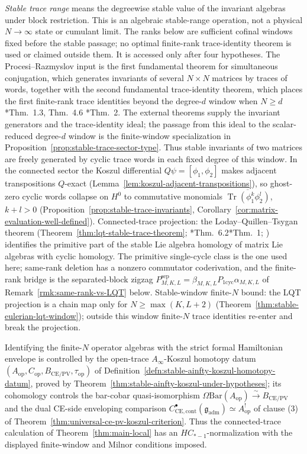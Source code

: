 \documentclass[11pt]{memoir}
\begin{document}
\emph{Stable trace range} means the degreewise stable value of the
invariant algebras under block restriction.  This is an algebraic
stable-range operation, not a physical \(N\to\infty\) state or cumulant
limit.  The ranks below are sufficient cofinal windows fixed before the
stable passage; no optimal finite-rank trace-identity theorem is used or
claimed outside them.  It is accessed only after four hypotheses.  The
Procesi--Razmyslov input is the first fundamental
theorem for simultaneous conjugation, which generates invariants of
several \(N\times N\) matrices by traces of words, together with the
second fundamental trace-identity theorem, which places the first
finite-rank trace identities beyond the degree-\(d\) window when
\(N\geq d\) \cite{procesi}*{Thm.~1.3, Thm.~4.6}
\cite{razmyslov}*{Thm.~2}.  The external theorems supply the invariant
generators and the trace-identity ideal; the passage from this ideal to
the scalar-reduced degree-\(d\) window is the finite-window
specialization in Proposition~\ref{prop:stable-trace-sector-type}.
Thus stable invariants of two matrices are freely generated by cyclic
trace words in each fixed degree of this window.  In the connected sector the Koszul
differential
\(Q\psi=[\phi_1,\phi_2]\) makes adjacent transpositions \(Q\)-exact
(Lemma~\ref{lem:koszul-adjacent-transpositions}), so ghost-zero cyclic words collapse
on \(H^0\) to commutative monomials
\(\overline{\operatorname{Tr}(\phi_1^k\phi_2^l)}\), \(k+l>0\)
(Proposition~\ref{prop:stable-trace-invariants},
Corollary~\ref{cor:matrix-evaluation-well-defined}).
Connected-trace projection: the Loday--Quillen--Tsygan theorem
(Theorem~\ref{thm:lqt-stable-trace-theorem};
\cite{loday-quillen}*{Thm.~6.2}\cite{tsygan}*{Thm.~1};
\cite{loday-vallette}) identifies the
primitive part of the stable Lie algebra homology of matrix Lie
algebras with cyclic homology.  The primitive single-cycle class is the
one used here; same-rank deletion has a nonzero commutator
coderivation, and the
finite-rank bridge is the separated-block zigzag
\(P^{\mathrm{sep}}_{M,K,L}=\beta_{M,K,L}P_{1\mathrm{cyc}}\alpha_{M,K,L}\)
of Remark~\ref{rmk:same-rank-vs-LQT} below.  Stable-window finite-\(N\)
bound: the LQT projection is a chain map only for \(N\ge\max(K,L+2)\)
(Theorem~\ref{thm:stable-eulerian-lqt-window}); outside this window
finite-\(N\) trace identities re-enter and break the projection.

Identifying the finite-\(N\) operator algebras with the strict formal
Hamiltonian envelope is controlled by the open-trace
\(A_\infty\)-Koszul homotopy datum
\((A_{\mathrm{op}},C_{\mathrm{op}},B_{\mathrm{CE/PV}},\tau_{\mathrm{op}})\)
of Definition~\ref{defn:stable-ainfty-koszul-homotopy-datum},
proved by Theorem~\ref{thm:stable-ainfty-koszul-under-hypotheses};
its cohomology controls the bar-cobar quasi-isomorphism
\(\Omega\mathrm{Bar}(A_{\mathrm{op}})\xrightarrow{\sim}B_{\mathrm{CE/PV}}\)
and the dual CE-side enveloping comparison
\(C^\bullet_{\mathrm{CE},\mathrm{cont}}(\mathfrak g_{\mathrm{adm}})
\simeq A_{\mathrm{op}}^!\)
of clause (3) of Theorem~\ref{thm:universal-ce-pv-koszul-criterion}.
Thus the connected-trace calculation of Theorem~\ref{thm:main-local}
has an \(HC_{*-1}\)-normalization with the displayed finite-window and
Milnor conditions imposed.
\end{document}
